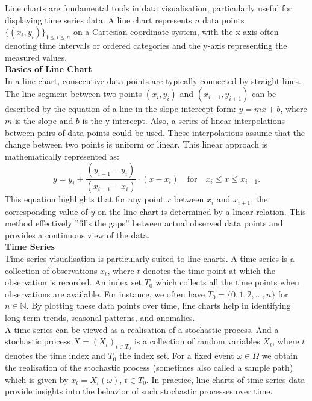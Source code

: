 \documentclass{article}\usepackage[]{graphicx}\usepackage[]{xcolor}
\begin{document}
Line charts are fundamental tools in data visualisation, particularly useful for displaying time series data. A line chart represents $n$ data points 
$\{(x_i,y_i)\}_{1 \leq i \leq n}$ on a Cartesian coordinate system, with the x-axis often denoting time intervals or ordered categories and the y-axis representing the measured values.\\ 

\noindent 
\textbf{Basics of Line Chart}\\

\noindent
In a line chart, consecutive data points are typically connected by straight lines. The line segment between two points \((x_i,y_i)\) and \((x_{i+1},y_{i+1})\) can be described by the equation of a line in the slope-intercept form: \(y=mx+b\), where \(m\) is the slope and \(b\) is the y-intercept. Also, a series of linear interpolations between pairs of data points could be used. These interpolations assume that the change between two points is uniform or linear. This linear approach is mathematically represented as:
\[
y = y_i + \frac{(y_{i+1} - y_i)}{(x_{i+1} - x_i)} \cdot (x - x_i) \quad \text{for} \quad x_i \leq x \leq x_{i+1}.
\]
\noindent
This equation highlights that for any point \(x\) between \(x_i\) and \(x_{i+1}\), the corresponding value of \(y\) on the line chart is determined by a linear relation. This method effectively ''fills the gaps'' between actual observed data points and provides a continuous view of the data.\\

\noindent 
\textbf{Time Series}\\

\noindent
Time series visualisation is particularly suited to line charts. A time series is a collection of observations $x_t$, where $t$ denotes the time point at which the observation is recorded. An index set $T_0$ which collects all the time points when observations are available. For instance, we often have $T_0 = \{0,1,2,...,n\}$ for $n \in \mathbb{N}$. By plotting these data points over time, line charts help in identifying long-term trends, seasonal patterns, and anomalies.\\

\noindent
A time series can be viewed as a realisation of a stochastic process. And a stochastic process $X = (X_t)_{t \in T_0}$ is a collection of random variables $X_t$, where $t$ denotes the time index and $T_0$ the index set. For a fixed event $\omega \in \Omega$ we obtain the realisation of the stochastic process (sometimes also called a sample path) which is given by $x_t = X_t(\omega)$, $t \in T_0$. In practice, line charts of time series data provide insights into the behavior of such stochastic processes over time.\\
\end{document}

